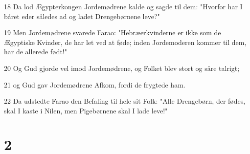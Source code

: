 \par 18 Da lod Ægypterkongen Jordemødrene kalde og sagde til dem: "Hvorfor har I båret eder således ad og ladet Drengebørnene leve?"
\par 19 Men Jordemødrene svarede Farao: "Hebræerkvinderne er ikke som de Ægyptiske Kvinder, de har let ved at føde; inden Jordemoderen kommer til dem, har de allerede født!"
\par 20 Og Gud gjorde vel imod Jordemødrene, og Folket blev stort og såre talrigt;
\par 21 og Gud gav Jordemødrene Afkom, fordi de frygtede ham.
\par 22 Da udstedte Farao den Befaling til hele sit Folk: "Alle Drengebørn, der fødes, skal I kaste i Nilen, men Pigebørnene skal I lade leve!"

\chapter{2}

